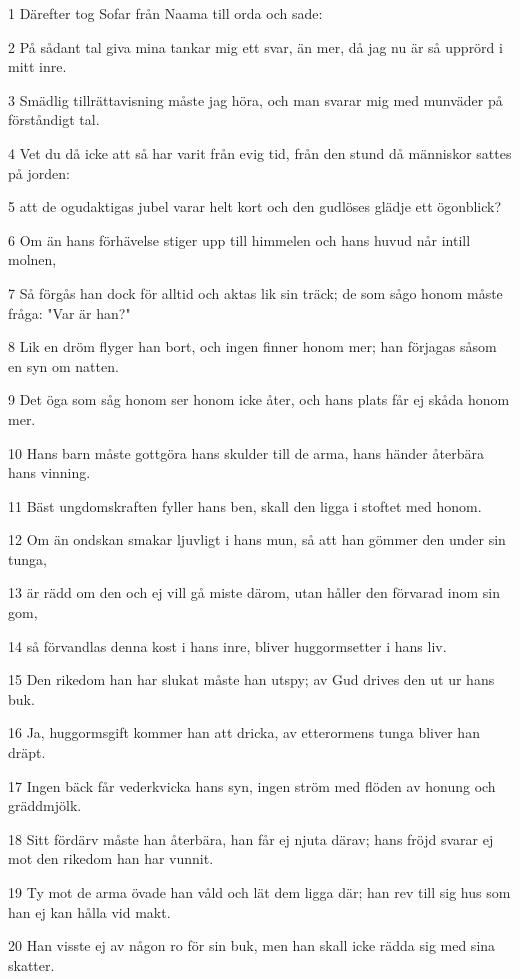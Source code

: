 \par 1 Därefter tog Sofar från Naama till orda och sade:
\par 2 På sådant tal giva mina tankar mig ett svar, än mer, då jag nu är så upprörd i mitt inre.
\par 3 Smädlig tillrättavisning måste jag höra, och man svarar mig med munväder på förståndigt tal.
\par 4 Vet du då icke att så har varit från evig tid, från den stund då människor sattes på jorden:
\par 5 att de ogudaktigas jubel varar helt kort och den gudlöses glädje ett ögonblick?
\par 6 Om än hans förhävelse stiger upp till himmelen och hans huvud når intill molnen,
\par 7 Så förgås han dock för alltid och aktas lik sin träck; de som sågo honom måste fråga: "Var är han?"
\par 8 Lik en dröm flyger han bort, och ingen finner honom mer; han förjagas såsom en syn om natten.
\par 9 Det öga som såg honom ser honom icke åter, och hans plats får ej skåda honom mer.
\par 10 Hans barn måste gottgöra hans skulder till de arma, hans händer återbära hans vinning.
\par 11 Bäst ungdomskraften fyller hans ben, skall den ligga i stoftet med honom.
\par 12 Om än ondskan smakar ljuvligt i hans mun, så att han gömmer den under sin tunga,
\par 13 är rädd om den och ej vill gå miste därom, utan håller den förvarad inom sin gom,
\par 14 så förvandlas denna kost i hans inre, bliver huggormsetter i hans liv.
\par 15 Den rikedom han har slukat måste han utspy; av Gud drives den ut ur hans buk.
\par 16 Ja, huggormsgift kommer han att dricka, av etterormens tunga bliver han dräpt.
\par 17 Ingen bäck får vederkvicka hans syn, ingen ström med flöden av honung och gräddmjölk.
\par 18 Sitt fördärv måste han återbära, han får ej njuta därav; hans fröjd svarar ej mot den rikedom han har vunnit.
\par 19 Ty mot de arma övade han våld och lät dem ligga där; han rev till sig hus som han ej kan hålla vid makt.
\par 20 Han visste ej av någon ro för sin buk, men han skall icke rädda sig med sina skatter.
